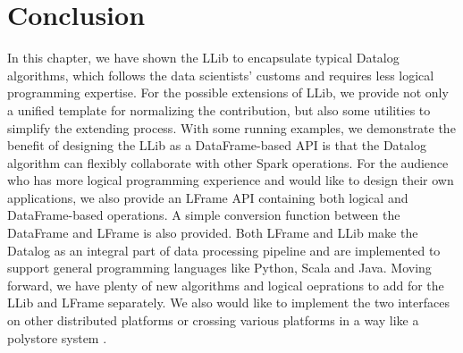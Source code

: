 \section{Conclusion}
\label{conclusion}

In this chapter, we have shown the LLib to encapsulate typical Datalog algorithms, which follows the data scientists' customs  and requires less logical programming expertise.  For the possible  extensions of LLib, we provide not only a unified template for normalizing the contribution, but also some utilities to simplify the extending process.  With some running examples, we  demonstrate the benefit of designing the LLib as a DataFrame-based API is that the Datalog algorithm can flexibly collaborate with other Spark operations. For the audience who has more logical programming experience and would like to design their own applications, we also provide an LFrame API containing both logical and DataFrame-based operations. A simple conversion function between the DataFrame and LFrame is also provided. Both LFrame and LLib make the Datalog as an integral part of data processing pipeline and are implemented to support general programming languages like Python, Scala and Java. Moving forward, we have  plenty of new algorithms and logical oeprations to add for the LLib and LFrame separately. We also  would like to implement the two interfaces on other distributed platforms or crossing various platforms in a way like a polystore system \citep{duggan2015bigdawg}.
